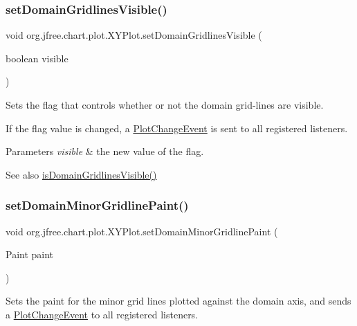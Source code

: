 \subsubsection{\texorpdfstring{set\+Domain\+Gridlines\+Visible()}{setDomainGridlinesVisible()}}
{\footnotesize\ttfamily void org.\+jfree.\+chart.\+plot.\+X\+Y\+Plot.\+set\+Domain\+Gridlines\+Visible (\begin{DoxyParamCaption}\item[{boolean}]{visible }\end{DoxyParamCaption})}

Sets the flag that controls whether or not the domain grid-\/lines are visible. 

If the flag value is changed, a \mbox{\hyperlink{}{Plot\+Change\+Event}} is sent to all registered listeners.


\begin{DoxyParams}{Parameters}
{\em visible} & the new value of the flag.\\
\hline
\end{DoxyParams}
\begin{DoxySeeAlso}{See also}
\mbox{\hyperlink{classorg_1_1jfree_1_1chart_1_1plot_1_1_x_y_plot_a7b58c4b7a9e1a4eb424ff0bc9ce7e99c}{is\+Domain\+Gridlines\+Visible()}} 
\end{DoxySeeAlso}
\mbox{\label{classorg_1_1jfree_1_1chart_1_1plot_1_1_x_y_plot_a07e0f74340d81ef71cab595e7c666c0c}} 
\subsubsection{\texorpdfstring{set\+Domain\+Minor\+Gridline\+Paint()}{setDomainMinorGridlinePaint()}}
{\footnotesize\ttfamily void org.\+jfree.\+chart.\+plot.\+X\+Y\+Plot.\+set\+Domain\+Minor\+Gridline\+Paint (\begin{DoxyParamCaption}\item[{Paint}]{paint }\end{DoxyParamCaption})}

Sets the paint for the minor grid lines plotted against the domain axis, and sends a \mbox{\hyperlink{}{Plot\+Change\+Event}} to all registered listeners.


